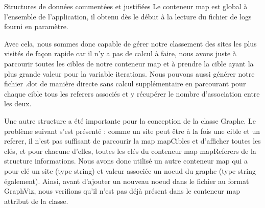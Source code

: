 \documentclass[11pt]{article}
\begin{document}
\begin{section}{Structures de données commentées et justifiées}
Le conteneur map est global à l'ensemble de l'application, il obtenu dès le début à la lecture du fichier de logs fourni en paramètre. 

Avec cela, nous sommes donc capable de gérer notre classement des sites les plus visités de façon rapide car il n'y a pas de calcul à faire, nous avons juste à parcourir toutes les cibles de notre conteneur map et à prendre la cible ayant la plus grande valeur pour la variable iterations. Nous pouvons aussi générer notre fichier .dot de manière directe sans calcul supplémentaire en parcourant pour chaque cible tous les referers associés et y récupérer le nombre d'association entre les deux.
\newline

Une autre structure a été importante pour la conception de la classe Graphe. Le problème suivant s'est présenté : comme un site peut être à la fois une cible et un referer, il n'est pas suffisant de parcourir la map mapCibles et d'afficher toutes les clés, et pour chacune d'elles, toutes les clés du conteneur map mapReferers de la structure informations. Nous avons donc utilisé un autre conteneur map qui a pour clé un site (type string) et valeur associée un noeud du graphe (type string également). Ainsi, avant d'ajouter un nouveau noeud dans le fichier au format GraphViz, nous verifions qu'il n'est pas déjà présent dans le conteneur map attribut de la classe.




\end{section}
\end{document}
